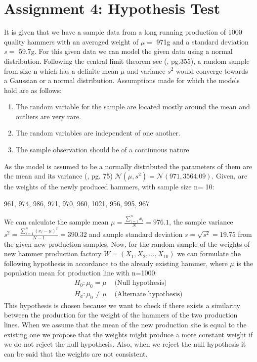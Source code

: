 \chapter{Assignment 4: Hypothesis Test}
It is given that we have a sample data from a long running production of 1000 quality hammers with an averaged weight of $\mu =$ 971g and a standard deviation $s= $ 59.7g. For this given data we can model the given data using a normal distribution. Following the central limit theorem see (\cite{hogg:2005}, pg.355), a random sample from size n which has a definite mean $\mu $ and variance $s^2$ would converge towards a Gaussian or a normal distribution. Assumptions made for which the models hold are as follows:
\begin{enumerate}
    \item The random variable for the sample are located mostly around the mean and outliers are very rare.
    \item The random variables are independent of one another.
    \item The sample observation should be of a continuous nature
\end{enumerate}
As the model is assumed to be a normally distributed the parameters of them are the mean and its variance (\cite{Iubh:2021}, pg. 75) $\mathcal{N}(\mu, s^2) = \mathcal{N}(971, 3564.09)$.\newline
Given, are the weights of the newly produced hammers, with sample size n= 10:
\begin{center}
    961, 974, 986, 971, 970, 960, 1021, 956, 995, 967
\end{center} 
We can calculate the sample mean $\mu = \frac{\sum_{i=1}^{n}x_i}{N}=976.1$, the sample variance $s^2=\frac{\sum_{i=1}^{n}(x_i-\mu)^2}{N-1} = 390.32$ and sample standard deviation $s=\sqrt{s^2}=19.75$ from the given new production samples.
Now, for the random sample of the weights of new hammer production factory $W = (X_1, X_2, ..., X_{10})$ we can formulate the following hypothesis in accordance to the already existing hammer, where $\mu$ is the population mean for production line with n=1000:\newline
\begin{equation}
    \begin{split}
      H_0 : \mu_0 = \mu& \text{ (Null hypothesis)}\\
      H_a: \mu_0 \neq \mu& \text{ (Alternate hypothesis)}
    \end{split}
\end{equation}
This hypothesis is chosen because we want to check if there exists a similarity between the production for the weight of the hammers of the two production lines. When we assume that the mean of the new production site is equal to the existing one we propose that the weights might produce a more constant weight if we do not reject the null hypothesis. Also, when we reject the null hypothesis it can be said that the weights are not consistent.\newline\newline
